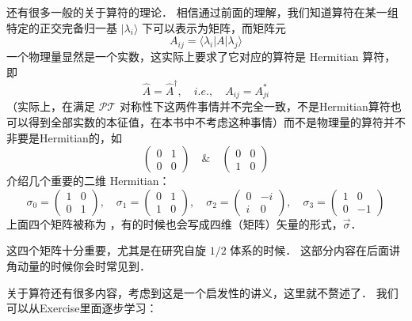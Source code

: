 还有很多一般的关于算符的理论． 相信通过前面的理解，我们知道算符在某一组特定的正交完备归一基 $|\lambda_i\rangle$ 下可以表示为矩阵，而矩阵元
\begin{equation}
A_{ij} = \langle\lambda_i|A|\lambda_j\rangle
\end{equation}
一个物理量显然是一个实数，这实际上要求了它对应的算符是 Hermitian 算符，即
\begin{equation}
\hat{A} = \hat{A}^{\dagger},\quad i.e.,\quad A_{ij} = A_{ji}^*
\end{equation}
（实际上，在满足 $\mathcal{PT}$ 对称性下这两件事情并不完全一致，不是Hermitian算符也可以得到全部实数的本征值，在本书中不考虑这种事情）而不是物理量的算符并不非要是Hermitian的，如
\begin{equation}
\left(\begin{matrix}0 & 1\\0 & 0\end{matrix}\right) \quad \& \quad \left(\begin{matrix}0 & 0\\1 & 0\end{matrix}\right)
\end{equation}
介绍几个重要的二维 Hermitian：
\begin{equation}\label{Basics_eq18}
\sigma_0 = \left(\begin{matrix}1 & 0\\0 & 1\end{matrix}\right),
\quad\sigma_1 = \left(\begin{matrix} 0 & 1\\1 & 0\end{matrix}\right),
\quad\sigma_2 = \left(\begin{matrix} 0 & -i\\i & 0\end{matrix}\right),
\quad\sigma_3 = \left(\begin{matrix} 1 & 0\\0 & -1\end{matrix}\right)  
\end{equation}
上面四个矩阵被称为 ，有的时候也会写成四维（矩阵）矢量的形式，$\vec{\sigma}$．

这四个矩阵十分重要，尤其是在研究自旋 $1/2$ 体系的时候． 这部分内容在后面讲角动量的时候你会时常见到．

关于算符还有很多内容，考虑到这是一个启发性的讲义，这里就不赘述了． 我们可以从Exercise里面逐步学习：

